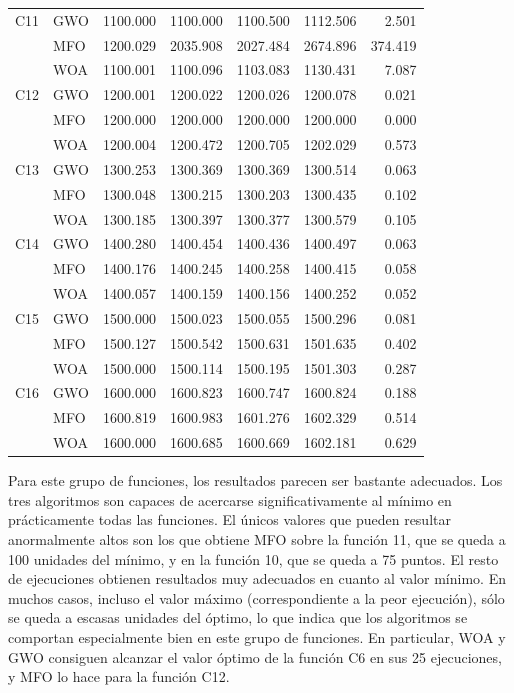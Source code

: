 \documentclass[
  a4paper,
,tablecaptionabove
]{scrartcl}
\begin{document}
\begin{longtable}{llrrrrr}
\midrule
C11 & GWO & 1100.000 & 1100.000 & 1100.500 & 1112.506 &   2.501 \\
    & MFO & 1200.029 & 2035.908 & 2027.484 & 2674.896 & 374.419 \\
    & WOA & 1100.001 & 1100.096 & 1103.083 & 1130.431 &   7.087 \\
\midrule
C12 & GWO & 1200.001 & 1200.022 & 1200.026 & 1200.078 &   0.021 \\
    & MFO & 1200.000 & 1200.000 & 1200.000 & 1200.000 &   0.000 \\
    & WOA & 1200.004 & 1200.472 & 1200.705 & 1202.029 &   0.573 \\
\midrule
C13 & GWO & 1300.253 & 1300.369 & 1300.369 & 1300.514 &   0.063 \\
    & MFO & 1300.048 & 1300.215 & 1300.203 & 1300.435 &   0.102 \\
    & WOA & 1300.185 & 1300.397 & 1300.377 & 1300.579 &   0.105 \\
\midrule
C14 & GWO & 1400.280 & 1400.454 & 1400.436 & 1400.497 &   0.063 \\
    & MFO & 1400.176 & 1400.245 & 1400.258 & 1400.415 &   0.058 \\
    & WOA & 1400.057 & 1400.159 & 1400.156 & 1400.252 &   0.052 \\
\midrule
C15 & GWO & 1500.000 & 1500.023 & 1500.055 & 1500.296 &   0.081 \\
    & MFO & 1500.127 & 1500.542 & 1500.631 & 1501.635 &   0.402 \\
    & WOA & 1500.000 & 1500.114 & 1500.195 & 1501.303 &   0.287 \\
\midrule
C16 & GWO & 1600.000 & 1600.823 & 1600.747 & 1600.824 &   0.188 \\
    & MFO & 1600.819 & 1600.983 & 1601.276 & 1602.329 &   0.514 \\
    & WOA & 1600.000 & 1600.685 & 1600.669 & 1602.181 &   0.629 \\
\bottomrule
\end{longtable}

Para este grupo de funciones, los resultados parecen ser bastante
adecuados. Los tres algoritmos son capaces de acercarse
significativamente al mínimo en prácticamente todas las funciones. El
únicos valores que pueden resultar anormalmente altos son los que
obtiene MFO sobre la función 11, que se queda a 100 unidades del mínimo,
y en la función 10, que se queda a 75 puntos. El resto de ejecuciones
obtienen resultados muy adecuados en cuanto al valor mínimo. En muchos
casos, incluso el valor máximo (correspondiente a la peor ejecución),
sólo se queda a escasas unidades del óptimo, lo que indica que los
algoritmos se comportan especialmente bien en este grupo de funciones.
En particular, WOA y GWO consiguen alcanzar el valor óptimo de la
función C6 en sus 25 ejecuciones, y MFO lo hace para la función C12.
\end{document}
